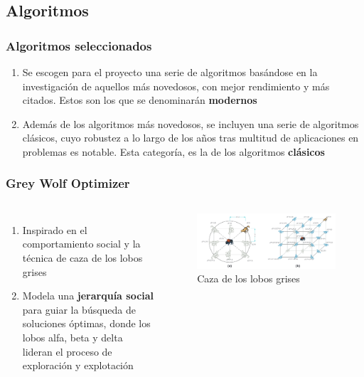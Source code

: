 \subsection{Algoritmos}
\begin{frame}
  \frametitle{Algoritmos seleccionados}
  \begin{enumerate}
    \item Se escogen para el proyecto una serie de algoritmos basándose en la investigación de aquellos más novedosos, con mejor rendimiento y más citados. Estos son los que se denominarán \textbf{modernos}
    \item Además de los algoritmos más novedosos, se incluyen una serie de algoritmos clásicos, cuyo robustez a lo largo de los años tras multitud de aplicaciones en problemas es notable. Esta categoría, es la de los algoritmos \textbf{clásicos}
  \end{enumerate}
\end{frame}

\begin{frame}
  \frametitle{Grey Wolf Optimizer}
  \begin{columns}
    \begin{enumerate}
      \item Inspirado en el comportamiento social y la técnica de caza de los lobos grises
      \item Modela una \textbf{jerarquía social} para guiar la búsqueda de soluciones óptimas, donde los lobos alfa, beta y delta lideran el proceso de exploración y explotación
    \end{enumerate}
    \begin{figure}
      \begin{center}
        \includegraphics[width=\textwidth]{imagenes/chapter3/grey-wolf-hunt.png}
      \end{center}
      \caption{Caza de los lobos grises \footnotemark[4]}
    \end{figure}
  \end{columns}
\end{frame}

